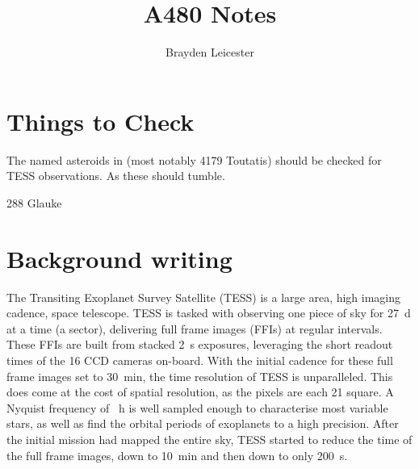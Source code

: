 \documentclass[12pt]{article}
\title{A480 Notes}
\author{Brayden Leicester}
\begin{document}
\maketitle

\section{Things to Check}
The named asteroids in \cite{Harris1994} (most notably 4179 Toutatis) should be checked for TESS observations. As these should tumble.

288 Glauke \cite{Harris2015}

\section{Background writing}

The Transiting Exoplanet Survey Satellite (TESS) \cite{Ricker2014} is a large area, high imaging cadence, space telescope. 
TESS is tasked with observing one piece of sky for \qty{27}{\day} at a time (a sector), delivering  full frame images (FFIs) at regular intervals. 
These FFIs are built from stacked \qty{2}{\second} exposures, leveraging the short readout times of the 16 CCD cameras on-board. 
With the initial cadence for these full frame images set to \qty{30}{\minute}, the time resolution of TESS is unparalleled. 
This does come at the cost of spatial resolution, as the pixels are each \qty{21}{\arcsec} square. 
A Nyquist frequency of \unit{\per\hour} is well sampled enough to characterise most variable stars, as well as find the orbital periods of exoplanets to a high precision. 
After the initial mission had mapped the entire sky, TESS started to reduce the time of the full frame images, down to \qty{10}{\minute} and then down to only \qty{200}{\second}.
\end{document}
